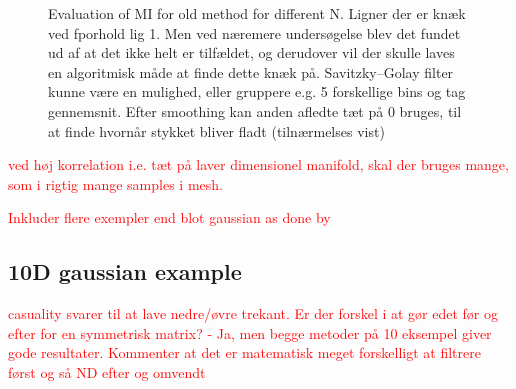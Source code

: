 \documentclass[../Thesis.tex]{subfiles}
\begin{document}
\begin{figure}[h]
\begin{subfigure}[t]{0.32\textwidth}
        \caption{}
        \label{subfig:ddd}
    \end{subfigure}
    \caption{Evaluation of MI for old method for different N. Ligner der er knæk ved fporhold lig 1. Men ved næremere undersøgelse blev det fundet ud af at det ikke helt er tilfældet, og derudover vil der skulle laves en algoritmisk måde at finde dette knæk på. Savitzky–Golay filter kunne være en mulighed, eller gruppere e.g. 5 forskellige bins og tag gennemsnit. Efter smoothing kan anden afledte tæt på 0 bruges, til at finde hvornår stykket bliver fladt (tilnærmelses vist)}
    \label{fig:ddd}
\end{figure}

\textcolor{red}{ved høj korrelation i.e. tæt på laver dimensionel manifold, skal der bruges mange, som i rigtig mange samples i mesh. }


\textcolor{red}{Inkluder flere exempler end blot gaussian as done by \cite{Estimating-mutual-information-Kraskov}}

\subsection{10D gaussian example}
\textcolor{red}{casuality svarer til at lave nedre/øvre trekant. Er der forskel i at gør edet før og efter for en symmetrisk matrix? - Ja, men begge metoder på 10 eksempel giver gode resultater. Kommenter at det er matematisk meget forskelligt at filtrere først og så ND efter og omvendt}
\end{document}
